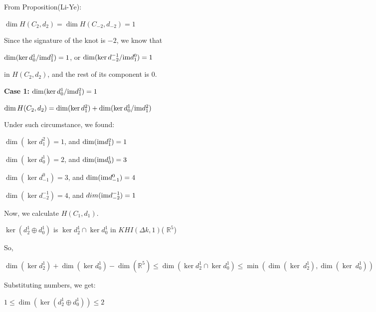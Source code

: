 \documentclass{amsart}
\theoremstyle{definition}
\newcommand{\im}{{\rm im}}
\begin{document}
From Proposition(Li-Ye): 

\begin{center}
  $ \dim H(C_2,d_2)=\dim H(C_{-2},d_{-2})=1$
\end{center}
   


Since the signature of the knot is $-2$, we know that 
\begin{center}
$\dim (\ker d^1_0\slash \im d^2_1)=1$, or
$\dim (\ker d^{-1}_{-2}\slash\im d^0_1)=1$
\end{center}
in $H(C_2,d_2)$, and the rest of its component is $0$.



\bigskip
\textbf{Case 1:} $\dim (\ker d^1_0\slash \im d^2_1) =1$

$\dim H(C_2,d_2)= \dim(\ker d^2_1)+\dim (\ker d^1_0\slash \im d^2_1)$



Under such circumstance, we found:

\begin{center}
$\dim (\ker d^2_1) = 1$, and $\dim(\im d^2_1)=1$
 
$\dim (\ker d^1_0) = 2$, and $\dim(\im d^1_0) = 3$
 
$\dim (\ker d^0_{-1}) = 3$,  and $\dim(\im d^0_{-1})= 4$
 
$\dim (\ker d^{-1}_{-2}) = 4$, and $dim(\im d^{-1}_{-2}) = 1$
\end{center}

 


















 \bigskip
 Now, we calculate $H(C_1,d_1)$.


$\ker (d^1_2 \oplus d^1_0)$ is $\ker d^{1}_{2} \cap \ker d^1_0$ in $ KHI(\Delta k,1)$( $\mathbb{R}^5$) 

So,
\begin{center}
${\dim(\ker d^{1}_{2}) + \dim(\ker d^1_0) - \dim (\mathbb{R}^5) }
\leq
{\dim(\ker d^{1}_{2} \cap \ker d^1_0)}
\leq
{\min (\dim(\ker~d^{1}_{2}),\dim (\ker~d^1_0))}$
\end{center}


Substituting numbers, we get: 
 
 \begin{center}
     $1\leq\dim(\ker (d^1_2 \oplus d^1_0))\leq2$
 \end{center}
 
\end{document}
